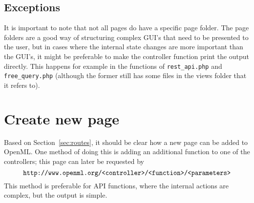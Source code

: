 \documentclass[10pt]{article}
\begin{document}
\subsection{Exceptions}
It is important to note that not all pages do have a specific page folder. The page folders are a good way of structuring complex GUI's that need to be presented to the user, but in cases where the internal state changes are more important than the GUI's, it might be preferable to make the controller function print the output directly. This happens for example in the functions of \texttt{rest\_api.php} and \texttt{free\_query.php} (although the former still has some files in the views folder that it refers to). 

\section{Create new page}
Based on Section~\ref{sec:routes}, it should be clear how a new page can be added to OpenML. One method of doing this is adding an additional function to one of the controllers; this page can later be requested by $$\texttt{http://www.openml.org/\textless controller\textgreater /\textless function\textgreater /\textless parameters\textgreater}$$
This method is preferable for API functions, where the internal actions are complex, but the output is simple. 
\end{document}

